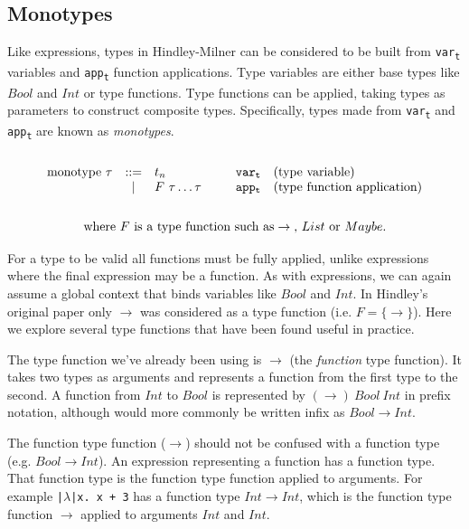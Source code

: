 \documentclass[a4paper,fleqn,oneside,12pt]{report}
\begin{document}
\subsection{Monotypes}

Like expressions, types in Hindley-Milner can be considered to be built from \texttt{var\textsubscript{t}} variables and \texttt{app\textsubscript{t}} function applications. Type variables are either base types like $Bool$ and $Int$ or type functions. Type functions can be applied, taking types as parameters to construct composite types. Specifically, types made from \texttt{var\textsubscript{t}} and \texttt{app\textsubscript{t}} are known as \textit{monotypes}.
$$\begin{array}{lcllll}
  \\
    \textrm{monotype}\ \tau & ::= & t_n               & \hspace{0.25cm} & \mathtt{var_t} & \textrm{(type variable)}\\
                          & \vert & F\ \tau \dots \tau &                 & \mathtt{app_t} & \textrm{(type function application)}\\
  \\
\end{array}
$$
\vspace{-0.8cm}
$$
\textrm{where }F\textrm{ is a type function such as}\rightarrow\textrm{, }List\textrm{ or }Maybe.\\
$$
\vspace{0cm} %

For a type to be valid all functions must be fully applied, unlike expressions where the final expression may be a function. As with expressions, we can again assume a global context that binds variables like $Bool$ and $Int$. In Hindley’s original paper only $\rightarrow$ was considered as a type function (i.e. $F = \{ \rightarrow \}$). Here we explore several type functions that have been found useful in practice.

The type function we've already been using is $\rightarrow$ (the \textit{function} type function). It takes two types as arguments and represents a function from the first type to the second. A function from $Int$ to $Bool$ is represented by $(\rightarrow)\ Bool\ Int$ in prefix notation, although would more commonly be written infix as $Bool \rightarrow Int$.

The function type function ($\rightarrow$) should not be confused with a function type (e.g. $Bool \rightarrow Int$). An expression representing a function has a function type. That function type is the function type function applied to arguments. For example \texttt{|$\lambda$|x. x + 3} has a function type $Int \rightarrow Int$, which is the function type function $\rightarrow$ applied to arguments $Int$ and $Int$.
\end{document}
